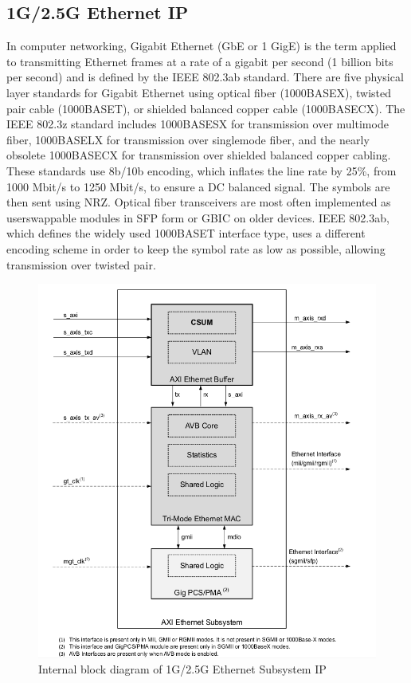 \subsection{1G/2.5G Ethernet IP}
In computer networking, Gigabit Ethernet (GbE or 1 GigE) is the term applied to transmitting Ethernet frames at a rate of a gigabit per second (1 billion bits per second) and is defined by the IEEE 802.3ab standard. There are five physical layer standards for Gigabit Ethernet using optical fiber (1000BASE\textendash X), twisted pair cable (1000BASE\textendash T), or shielded balanced copper cable (1000BASE\textendash CX). The IEEE 802.3z standard includes 1000BASE\textendash SX for transmission over multi\textendash mode fiber, 1000BASE\textendash LX for transmission over single\textendash mode fiber, and the nearly obsolete 1000BASE\textendash CX for transmission over shielded balanced copper cabling. These standards use 8b/10b encoding, which inflates the line rate by 25\%, from 1000 Mbit/s to 1250 Mbit/s, to ensure a DC balanced signal. The symbols are then sent using NRZ. Optical fiber transceivers are most often implemented as user\textendash swappable modules in SFP form or GBIC on older devices. IEEE 802.3ab, which defines the widely used 1000BASE\textendash T interface type, uses a different encoding scheme in order to keep the symbol rate as low as possible, allowing transmission over twisted pair. 
\begin{figure}[H]
\begin{center}
\includegraphics[width=\textwidth]{images/1G.png}
\caption{Internal block diagram of 1G/2.5G Ethernet Subsystem IP}
\label{1G}
\end{center}
\end{figure}
